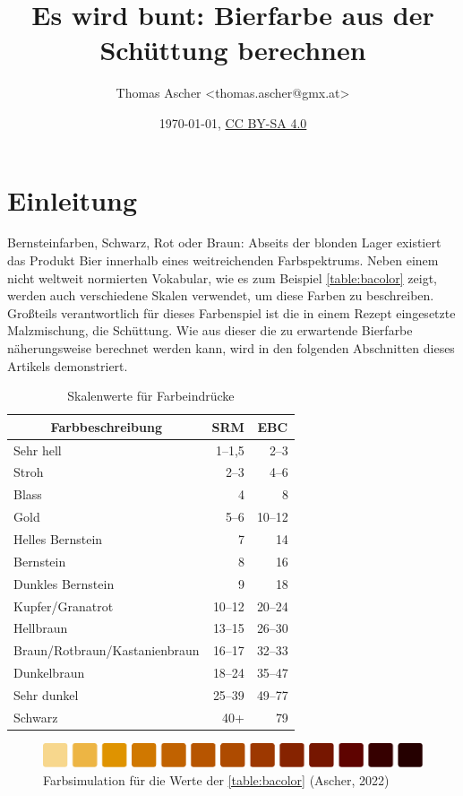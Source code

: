 \documentclass[a4paper,parskip=half]{scrartcl}
\title{Es wird bunt: Bierfarbe aus der Schüttung berechnen}
\author{Thomas Ascher <thomas.ascher@gmx.at>}
\date{\today, \href{http://creativecommons.org/licenses/by-sa/4.0/}{CC BY-SA 4.0}}
\begin{document}
\maketitle

\section*{Einleitung}

Bernsteinfarben, Schwarz, Rot oder Braun: Abseits der blonden Lager existiert das Produkt Bier innerhalb eines weitreichenden Farbspektrums. Neben einem nicht weltweit normierten Vokabular, wie es zum Beispiel \autoref{table:bacolor} zeigt, werden auch verschiedene Skalen verwendet, um diese Farben zu beschreiben. Großteils verantwortlich für dieses Farbenspiel ist die in einem Rezept eingesetzte Malzmischung, die Schüttung. Wie aus dieser die zu erwartende Bierfarbe näherungsweise berechnet werden kann, wird in den folgenden Abschnitten dieses Artikels demonstriert.

\begin{table}[H]
\centering
\begin{tabular}{lrr}
\toprule
\multicolumn{1}{c}{\textbf{Farbbeschreibung}} & \multicolumn{1}{c}{\textbf{SRM}} & \multicolumn{1}{c}{\textbf{EBC}} \\
\midrule
Sehr hell & 1–1,5 & 2–3  \\
Stroh & 2–3 & 4–6 \\
Blass & 4 & 8 \\
Gold & 5–6 & 10–12 \\
Helles Bernstein & 7 & 14 \\
Bernstein & 8 & 16 \\
Dunkles Bernstein & 9 & 18 \\
Kupfer/Granatrot & 10–12 & 20–24 \\
Hellbraun & 13–15 & 26–30 \\
Braun/Rotbraun/Kastanienbraun & 16–17 & 32–33 \\
Dunkelbraun & 18–24 & 35–47 \\
Sehr dunkel & 25–39 & 49–77 \\
Schwarz & 40+ & 79 \\
\bottomrule
\end{tabular}
\caption{Skalenwerte für Farbeindrücke \parencite{BA2021}}
\label{table:bacolor}
\end{table}

\begin{figure}[h]
\centering
\includegraphics[width=14cm]{colorscale.pdf}
\caption{Farbsimulation für die Werte der \autoref{table:bacolor} (Ascher, 2022)}
\label{fig:bacolorscale}
\end{figure}
\end{document}
